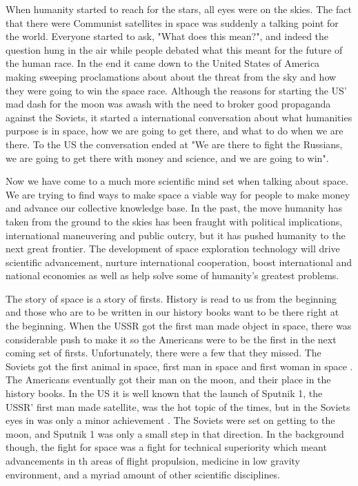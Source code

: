 \documentclass[a4paper,12pt]{article}
\begin{document}

\pagestyle{fancy}
\fancyhf{}
\fancyhead[R]{\thepage}

When humanity started to reach for the stars, all eyes were on the skies. The fact that there were Communist satellites in space was suddenly a talking point for the world. Everyone started to ask, "What does this mean?", and indeed the question hung in the air while people debated what this meant for the future of the human race. In the end it came down to the United States of America making sweeping proclamations about about the threat from the sky and how they were going to win the space race. Although the reasons for starting the US' mad dash for the moon was awash with the need to broker good propaganda against the Soviets, it started a international conversation about what humanities purpose is in space, how we are going to get there, and what to do when we are there. To the US the conversation ended at "We are there to fight the Russians, we are going to get there with money and science, and we are going to win". 

Now we have come to a much more scientific mind set when talking about space. We are trying to find ways to make space a viable way for people to make money and advance our collective knowledge base. In the past, the move humanity has taken from the ground to the skies has been fraught with political implications, international maneuvering and public outcry, but it has pushed humanity to the next great frontier. The development of space exploration technology will drive scientific advancement, nurture international cooperation, boost international and national economies as well as help solve some of humanity's greatest problems. 

The story of space is a story of firsts. History is read to us from the beginning and those who are to be written in our history books want to be there right at the beginning. When the USSR got the first man made object in space, there was considerable push to make it so the Americans were to be the first in the next coming set of firsts. Unfortunately, there were a few that they missed. The Soviets got the first animal in space, first man in space and first woman in space \autocite{west2001}. The Americans eventually got their man on the moon, and their place in the history books. In the US it is well known that the launch of Sputnik 1, the USSR' first man made satellite, was the hot topic of the times, but in the Soviets eyes in was only a minor achievement \autocite{west2001}. The Soviets were set on getting to the moon, and Sputnik 1 was only a small step in that direction. In the background though, the fight for space was a fight for technical superiority which meant advancements in th areas of flight propulsion, medicine in low gravity environment, and a myriad amount of other scientific disciplines. 
\end{document}
